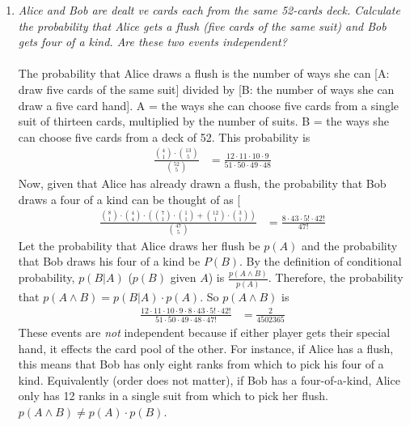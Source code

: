 \documentclass[12pt]{article}
\begin{document}
\begin{enumerate}
\item\emph{Alice and Bob are dealt ve cards each from the same 52-cards deck.
Calculate the probability that Alice gets a flush (five cards of the same suit) and Bob gets four of a kind. Are these two events independent?} \\
\\
The probability that Alice draws a flush is the number of ways she can [A: draw five cards of the same suit] divided by [B: the number of ways she can draw a five card hand]. A = the ways she can choose five cards from a single suit of thirteen cards, multiplied by the number of suits. B = the ways she can choose five cards from a deck of 52. This probability is 
\begin{align}
\nonumber \frac{\binom{4}{1} \cdot \binom{13}{5}}{\binom{52}{5}} &= \frac{12 \cdot 11 \cdot 10 \cdot 9}{51 \cdot 50 \cdot 49 \cdot 48}
\end{align}
Now, given that Alice has already drawn a flush, the probability that Bob draws a four of a kind can be thought of as [
\begin{align}
\nonumber \frac{\binom{8}{1} \cdot \binom{4}{4} \cdot (\binom{7}{1} \cdot \binom{1}{1} + \binom{12}{1} \cdot \binom{3}{1})}{\binom{47}{5}} &= \frac{8 \cdot 43 \cdot 5! \cdot 42!}{47!}
\end{align}
Let the probability that Alice draws her flush be $p(A)$ and the probability that Bob draws his four of a kind be $P(B)$. By the definition of conditional probability, $p(B|A)$ ($p(B)$ given $A$) is $\frac{p(A \land B)}{p(A)}$. Therefore, the probability that $p(A \land B) = p(B|A) \cdot p(A)$. So $p(A \land B)$ is
\begin{align}
\nonumber \frac{12 \cdot 11 \cdot 10 \cdot 9 \cdot 8 \cdot 43 \cdot 5! \cdot 42!}{51 \cdot 50 \cdot 49 \cdot 48 \cdot 47!} &= \frac{2}{4502365}
\end{align}
These events are \emph{not} independent because if either player gets their special hand, it effects the card pool of the other. For instance, if Alice has a flush, this means that Bob has only eight ranks from which to pick his four of a kind. Equivalently (order does not matter), if Bob has a four-of-a-kind, Alice only has 12 ranks in a single suit from which to pick her flush. $p(A \land B) \neq p(A) \cdot p(B)$.




\end{enumerate}
\end{document}
